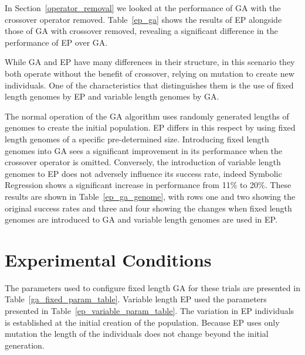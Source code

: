 In Section~\ref{operator_removal} we looked at the performance of GA with the crossover operator removed. Table~\ref{ep_ga} shows the results of EP alongside those of GA with crossover removed, revealing a significant difference in the performance of EP over GA.

While GA and EP have many differences in their structure, in this scenario they both operate without the benefit of crossover, relying on mutation to create new individuals. One of the characteristics that distinguishes them is the use of fixed length genomes by EP and variable length genomes by GA. 

The normal operation of the GA algorithm uses randomly generated lengths of genomes to create the initial population. EP differs in this respect by using fixed length genomes of a specific pre-determined size. Introducing fixed length genomes into GA sees a significant improvement in its performance when the crossover operator is omitted. Conversely, the introduction of variable length genomes to EP does not adversely influence its success rate, indeed Symbolic Regression shows a significant increase in performance from 11\% to 20\%. These results are shown in Table~\ref{ep_ga_genome}, with rows one and two showing the original success rates and three and four showing the changes when fixed length genomes are introduced to GA and variable length genomes are used in EP. 

\section{Experimental Conditions}
The parameters used to configure fixed length GA for these trials are presented in Table~\ref{ga_fixed_param_table}. Variable length EP used the parameters presented in Table~\ref{ep_variable_param_table}. The variation in EP individuals is established at the initial creation of the population. Because EP uses only mutation the length of the individuals does not change beyond the initial generation. 



